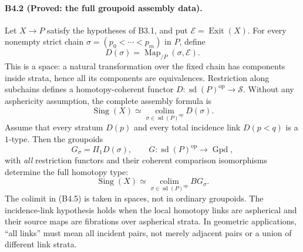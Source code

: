 \paragraph{B4.2 (Proved: the full groupoid assembly data).}
Let $X\to P$ satisfy the hypotheses of B3.1, and put
$\mathcal E=\operatorname{Exit}(X)$. For every nonempty strict chain
$\sigma=(p_0<\cdots<p_m)$ in $P$, define
\[
 D(\sigma)=\operatorname{Map}_{/P}(\sigma,\mathcal E).
 \tag{B4.3}
\]
This is a space: a natural transformation over the fixed chain has
components inside strata, hence all its components are equivalences.
Restriction along subchains defines a homotopy-coherent functor
$D:\operatorname{sd}(P)^{\mathrm{op}}\to\mathcal S$.
Without any asphericity assumption, the complete assembly formula is
\[
 \operatorname{Sing}(X)\simeq
 \operatorname*{colim}_{\sigma\in\operatorname{sd}(P)^{\mathrm{op}}}
 D(\sigma).
 \tag{B4.3a}
\]
Assume that every stratum $D(p)$ and every total incidence link
$D(p<q)$ is a $1$-type. Then the groupoids
\[
 G_\sigma=\Pi_1D(\sigma),
 \qquad
 G:\operatorname{sd}(P)^{\mathrm{op}}\longrightarrow\operatorname{Gpd},
 \tag{B4.4}
\]
with \emph{all} restriction functors and their coherent comparison
isomorphisms determine the full homotopy type:
\[
 \operatorname{Sing}(X)\simeq
       \operatorname*{colim}_{\sigma\in\operatorname{sd}(P)^{\mathrm{op}}}
                  BG_\sigma.
 \tag{B4.5}
\]
The colimit in (B4.5) is taken in spaces, not in ordinary groupoids.
The incidence-link hypothesis holds when the local homotopy links
are aspherical and their source maps are fibrations over
aspherical strata. In geometric applications, ``all links'' must
mean all incident pairs, not merely adjacent pairs or a union of
different link strata.

